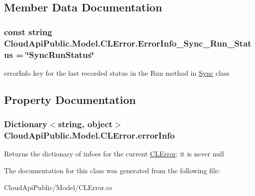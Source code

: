 \subsection{Member Data Documentation}
\hypertarget{class_cloud_api_public_1_1_model_1_1_c_l_error_a94652dc5f5c6747124cf4dded0ee17b0}{
\subsubsection[{Error\-Info\-\_\-\-Sync\-\_\-\-Run\-\_\-\-Status}]{\setlength{\rightskip}{0pt plus 5cm}const string Cloud\-Api\-Public.\-Model.\-C\-L\-Error.\-Error\-Info\-\_\-\-Sync\-\_\-\-Run\-\_\-\-Status = \char`\"{}Sync\-Run\-Status\char`\"{}}}\label{class_cloud_api_public_1_1_model_1_1_c_l_error_a94652dc5f5c6747124cf4dded0ee17b0}


error\-Info key for the last recorded status in the Run method in \hyperlink{namespace_cloud_api_public_1_1_sync}{Sync} class 



\subsection{Property Documentation}
\hypertarget{class_cloud_api_public_1_1_model_1_1_c_l_error_ae29296bb1f6e7b0992166ecc3df26662}{
\subsubsection[{error\-Info}]{\setlength{\rightskip}{0pt plus 5cm}Dictionary$<$string, object$>$ Cloud\-Api\-Public.\-Model.\-C\-L\-Error.\-error\-Info\hspace{0.3cm}{\ttfamily [get]}}}\label{class_cloud_api_public_1_1_model_1_1_c_l_error_ae29296bb1f6e7b0992166ecc3df26662}


Returns the dictionary of infoes for the current \hyperlink{class_cloud_api_public_1_1_model_1_1_c_l_error}{C\-L\-Error}; it is never null 



The documentation for this class was generated from the following file\-:\begin{DoxyCompactItemize}
\item 
Cloud\-Api\-Public/\-Model/C\-L\-Error.\-cs\end{DoxyCompactItemize}
